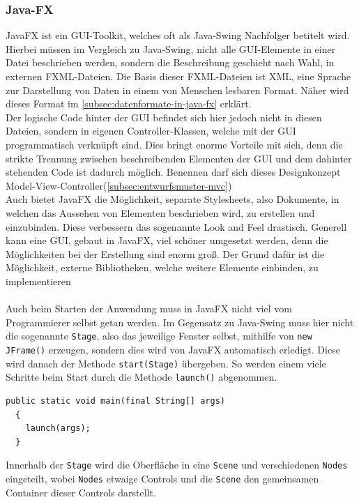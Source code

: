 \subsubsection{Java-FX}\label{sssec: JavaFX}
JavaFX ist ein GUI-Toolkit, welches oft als Java-Swing Nachfolger betitelt wird.
Hierbei müssen im Vergleich zu Java-Swing, nicht alle GUI-Elemente in einer Datei beschrieben werden, sondern die Beschreibung geschieht nach Wahl, in externen FXML-Dateien.
Die Basis dieser FXML-Dateien ist XML, eine Sprache zur Darstellung von Daten in einem von Menschen lesbaren Format.
Näher wird dieses Format im \autoref{subsec:datenformate-in-java-fx} erklärt.\\
Der logische Code hinter der GUI befindet sich hier jedoch nicht in diesen Dateien, sondern in eigenen Controller-Klassen, welche mit der GUI programmatisch verknüpft sind.
Dies bringt enorme Vorteile mit sich, denn die strikte Trennung zwischen beschreibenden Elementen der GUI und dem dahinter stehenden Code ist dadurch möglich.
Benennen darf sich dieses Designkonzept Model-View-Controller(\autoref{subsec:entwurfsmuster-mvc})\\
Auch bietet JavaFX die Möglichkeit, separate Stylesheets, also Dokumente, in welchen das Aussehen von Elementen beschrieben wird, zu erstellen und einzubinden.
Diese verbessern das sogenannte Look and Feel drastisch.
Generell kann eine GUI, gebaut in JavaFX, viel schöner umgesetzt werden, denn die Möglichkeiten bei der Erstellung sind enorm groß.
Der Grund dafür ist die Möglichkeit, externe Bibliotheken, welche weitere Elemente einbinden, zu implementieren\\\\
Auch beim Starten der Anwendung muss in JavaFX nicht viel vom Programmierer selbst getan werden.
Im Gegensatz zu Java-Swing muss hier nicht die sogenannte \lstinline[style=java]{Stage}, also das jeweilige Fenster selbst, mithilfe von \lstinline[style=java]{new JFrame()} erzeugen, sondern dies wird von JavaFX automatisch erledigt.
Diese wird danach der Methode \lstinline[style=java]{start(Stage)} übergeben.
So werden einem viele Schritte beim Start durch die Methode \lstinline[style=java]{launch()} abgenommen.
\begin{lstlisting}[style=java,caption=JavaFX Startvorgang,label=javafxStart]
  public static void main(final String[] args)
  {
    launch(args);
  }
\end{lstlisting}
\newpage
Innerhalb der \lstinline[style=java]{Stage} wird die Oberfläche in eine \lstinline[style=java]{Scene} und verschiedenen \lstinline[style=java]{Nodes} eingeteilt, wobei \lstinline[style=java]{Nodes} etwaige Controls und die \lstinline[style=java]{Scene} den gemeinsamen Container dieser Controls darstellt.
